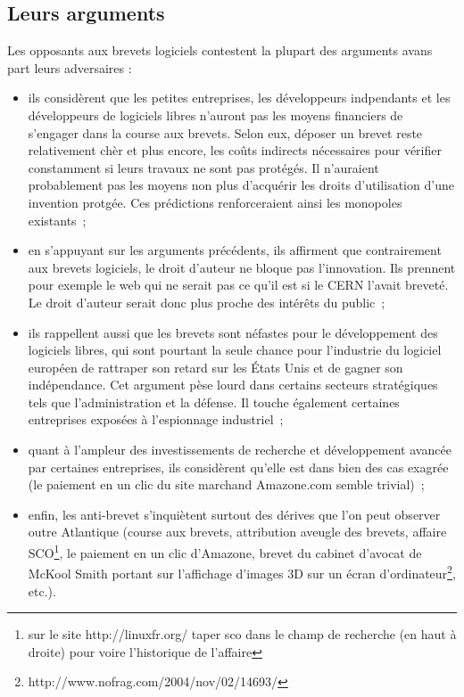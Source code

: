 \documentclass{report}
\begin{document}
\subsection{Leurs arguments}
Les opposants aux brevets logiciels contestent la plupart des arguments avans part leurs adversaires :
\begin{itemize}
\item ils considèrent que les petites entreprises, les développeurs indpendants et les développeurs de logiciels libres n'auront pas les moyens financiers de s'engager dans la course aux brevets. Selon eux, déposer un brevet reste relativement chèr et plus encore, les coûts indirects nécessaires pour vérifier constamment si leurs travaux ne sont pas protégés. Il n'auraient probablement pas les moyens non plus d'acquérir les droits d'utilisation d'une invention protgée. Ces prédictions renforceraient ainsi les monopoles existants~;
\item en s'appuyant sur les arguments précédents, ils affirment que contrairement aux brevets logiciels, le droit d'auteur ne bloque pas l'innovation. Ils prennent pour exemple le web qui ne serait pas ce qu'il est si le CERN l'avait breveté. Le droit d'auteur serait donc plus  proche des intérêts du public~;
\item ils rappellent aussi que les brevets sont néfastes pour le développement des logiciels libres, qui sont pourtant la seule chance pour l'industrie du logiciel européen de rattraper son retard sur les États Unis et de gagner son indépendance. Cet argument pèse lourd dans certains secteurs stratégiques tels que l'administration et la défense. Il touche également certaines entreprises exposées à l'espionnage industriel~;
\item quant à l'ampleur des investissements de recherche et développement avancée par certaines entreprises, ils considèrent qu'elle est dans bien des cas exagrée (le paiement en un clic du site marchand Amazone.com semble trivial)~;
\item enfin, les anti-brevet s'inquiètent surtout des dérives que l'on peut observer outre Atlantique (course aux brevets, attribution aveugle des brevets, affaire SCO\footnote{sur le site http://linuxfr.org/ taper sco dans le champ de recherche (en haut à droite) pour voire l'historique de l'affaire}, le paiement en un clic d'Amazone, brevet du cabinet d'avocat de McKool Smith portant sur l'affichage d'images 3D sur un écran d'ordinateur\footnote{http://www.nofrag.com/2004/nov/02/14693/}, etc.).
\end{itemize}
\end{document}
